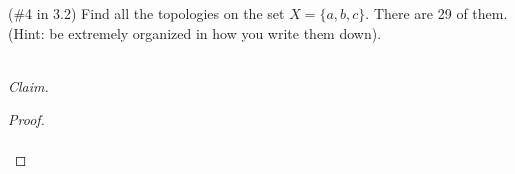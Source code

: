 (\#4 in 3.2) Find all the topologies on the set $X = \{a,b,c\}$. There are 29 of them. (Hint: be extremely organized in how you write them down). 

\ \\
\emph{Claim.}

\begin{proof}\renewcommand{\qedsymbol}{}\ \\\\
\end{proof}
